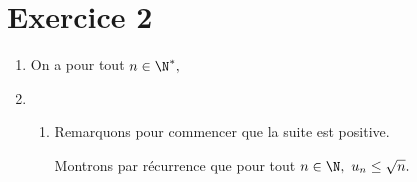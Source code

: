 \documentclass[a4paper,twoside,french,10pt]{VcCours}
\begin{document}
\section*{Exercice 2}
\begin{enumerate}

\item On a pour tout $n\in\N^*,$ 

\item

\begin{enumerate}

\item Remarquons pour commencer que la suite est positive.

\medskip

\noindent Montrons par r\'ecurrence que pour tout $n\in\N, \ u_n\leq
\sqrt{n}.$


\end{enumerate}
\end{enumerate}
\end{document}
